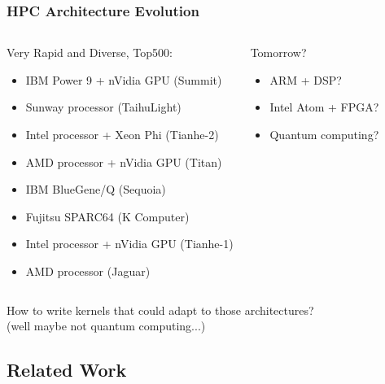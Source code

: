\documentclass{beamer}
\begin{document}
\begin{frame}
  \frametitle{HPC Architecture Evolution}

  \begin{columns}

  \begin{block}{\footnotesize Very Rapid and Diverse, Top500:}
    \begin{itemize}
      \item \scriptsize IBM Power 9 + nVidia GPU (Summit)
      \item \scriptsize Sunway processor (TaihuLight)
      \item \scriptsize Intel processor + Xeon Phi (Tianhe-2)
      \item \scriptsize AMD processor + nVidia GPU (Titan)
      \item \scriptsize IBM BlueGene/Q (Sequoia)
      \item \scriptsize Fujitsu SPARC64 (K Computer)
      \item \scriptsize Intel processor + nVidia GPU (Tianhe-1)
      \item \scriptsize AMD processor (Jaguar)
    \end{itemize}
  \end{block}

  \begin{block}{\footnotesize Tomorrow?}
    \begin{itemize}
      \item \scriptsize ARM + DSP?
      \item \scriptsize Intel Atom + FPGA?
      \item \scriptsize Quantum computing?
    \end{itemize}
  \end{block}

  \end{columns}

  \vspace{1cm}
  How to write kernels that could adapt to those architectures?\\
  (well maybe not quantum computing...)

\end{frame}

\subsection{Related Work}
\end{document}
